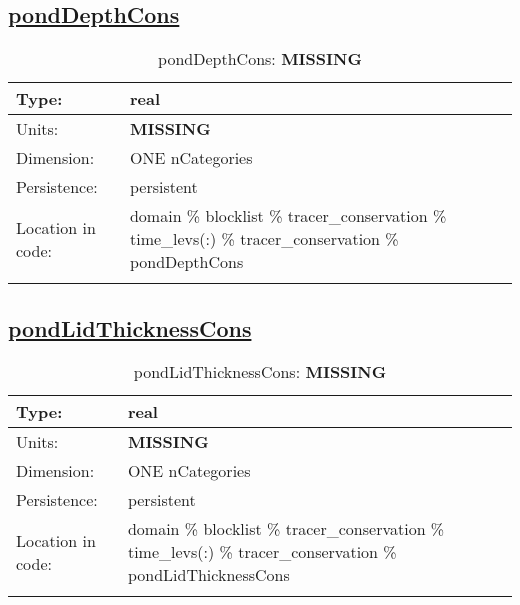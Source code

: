 \subsection[pondDepthCons]{\hyperref[sec:var_tab_tracer_conservation]{pondDepthCons}}
\label{subsec:var_sec_tracer_conservation_pondDepthCons}
\begin{center}
\begin{longtable}{| p{2.0in} | p{4.0in} |}
        \hline 
        Type: & real \\
        \hline 
        Units: & {\bf \color{red} MISSING} \\
        \hline 
        Dimension: & ONE nCategories \\
        \hline 
        Persistence: & persistent \\
        \hline 
         Location in code: & domain \% blocklist \% tracer\_conservation \% time\_levs(:) \% tracer\_conservation \% pondDepthCons \\
         \hline 
    \caption{pondDepthCons: {\bf \color{red} MISSING}}
\end{longtable}
\end{center}
\subsection[pondLidThicknessCons]{\hyperref[sec:var_tab_tracer_conservation]{pondLidThicknessCons}}
\label{subsec:var_sec_tracer_conservation_pondLidThicknessCons}
\begin{center}
\begin{longtable}{| p{2.0in} | p{4.0in} |}
        \hline 
        Type: & real \\
        \hline 
        Units: & {\bf \color{red} MISSING} \\
        \hline 
        Dimension: & ONE nCategories \\
        \hline 
        Persistence: & persistent \\
        \hline 
         Location in code: & domain \% blocklist \% tracer\_conservation \% time\_levs(:) \% tracer\_conservation \% pondLidThicknessCons \\
         \hline 
    \caption{pondLidThicknessCons: {\bf \color{red} MISSING}}
\end{longtable}
\end{center}

